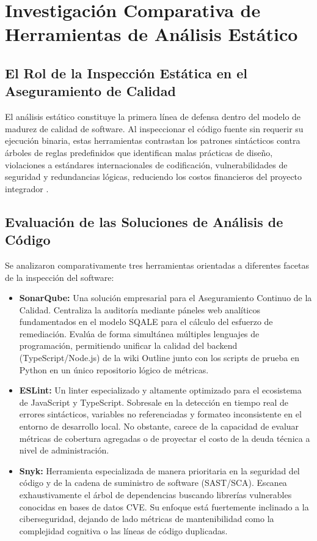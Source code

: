 \documentclass[12pt,oneside]{report}
\begin{document}
\chapter{Investigación Comparativa de Herramientas de Análisis Estático}

\section{El Rol de la Inspección Estática en el Aseguramiento de Calidad}
El análisis estático constituye la primera línea de defensa dentro del modelo de madurez de calidad de software. Al inspeccionar el código fuente sin requerir su ejecución binaria, estas herramientas contrastan los patrones sintácticos contra árboles de reglas predefinidos que identifican malas prácticas de diseño, violaciones a estándares internacionales de codificación, vulnerabilidades de seguridad y redundancias lógicas, reduciendo los costos financieros del proyecto integrador \parencite{myers2011}.

\section{Evaluación de las Soluciones de Análisis de Código}
Se analizaron comparativamente tres herramientas orientadas a diferentes facetas de la inspección del software:
\begin{itemize}
    \item \textbf{SonarQube:} Una solución empresarial para el Aseguramiento Continuo de la Calidad. Centraliza la auditoría mediante páneles web analíticos fundamentados en el modelo SQALE para el cálculo del esfuerzo de remediación. Evalúa de forma simultánea múltiples lenguajes de programación, permitiendo unificar la calidad del backend (TypeScript/Node.js) de la wiki Outline junto con los scripts de prueba en Python en un único repositorio lógico de métricas.
    \item \textbf{ESLint:} Un linter especializado y altamente optimizado para el ecosistema de JavaScript y TypeScript. Sobresale en la detección en tiempo real de errores sintácticos, variables no referenciadas y formateo inconsistente en el entorno de desarrollo local. No obstante, carece de la capacidad de evaluar métricas de cobertura agregadas o de proyectar el costo de la deuda técnica a nivel de administración.
    \item \textbf{Snyk:} Herramienta especializada de manera prioritaria en la seguridad del código y de la cadena de suministro de software (SAST/SCA). Escanea exhaustivamente el árbol de dependencias buscando librerías vulnerables conocidas en bases de datos CVE. Su enfoque está fuertemente inclinado a la ciberseguridad, dejando de lado métricas de mantenibilidad como la complejidad cognitiva o las líneas de código duplicadas.
\end{itemize}
\end{document}
